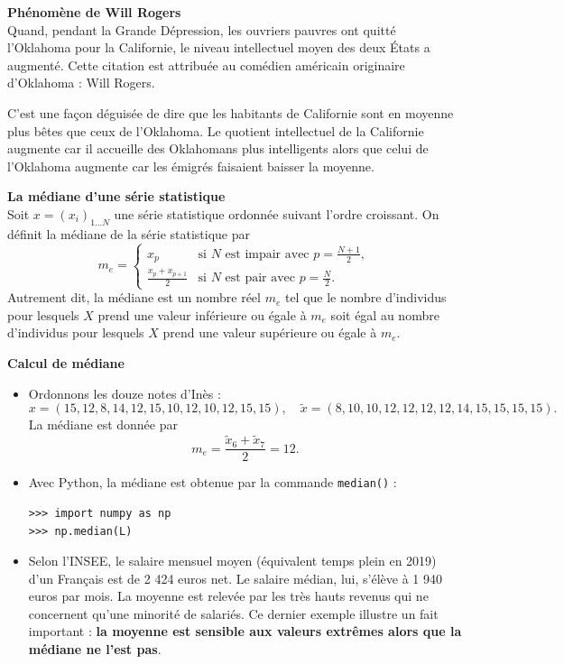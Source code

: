\documentclass[../PolyS4.tex]{subfiles}
\begin{document}
\begin{Rmq}\textbf{Phénomène de Will Rogers}\\

\og  Quand, pendant la Grande Dépression, les ouvriers pauvres ont quitté l'Oklahoma pour la Californie, le niveau intellectuel moyen des deux États a augmenté. \fg{}  Cette citation est attribuée au comédien américain originaire d'Oklahoma : Will Rogers.

C'est une façon déguisée de dire que les habitants de Californie sont en moyenne plus bêtes que ceux de l'Oklahoma. Le quotient intellectuel de la Californie augmente car il accueille des Oklahomans plus intelligents alors que celui de l'Oklahoma augmente car les émigrés faisaient baisser la moyenne.
\end{Rmq}

\begin{Def}\textbf{La médiane d'une série statistique}\\

Soit $x = (x_i)_{1 \ldots N}$ une série statistique ordonnée suivant l'ordre croissant. On définit la médiane de la série statistique par
\[
m_e =
\begin{cases}
x_p & \text{si } N \text{ est impair avec } p = \frac{N + 1}{2}, \\
\frac{x_p + x_{p+1}}{2} & \text{si } N \text{ est pair avec } p = \frac{N}{2}.
\end{cases}
\]
Autrement dit, la médiane est un nombre réel $m_e$ tel que le nombre d'individus pour lesquels $X$ prend une valeur inférieure ou égale à $m_e$ soit égal au nombre d'individus pour lesquels $X$ prend une valeur supérieure ou égale à $m_e$.
\end{Def}

\begin{Ex}\textbf{Calcul de médiane}\\

\begin{itemize}
    \item Ordonnons les douze notes d'Inès : 
    \[
    x = (15, 12, 8, 14, 12, 15, 10, 12, 10, 12, 15, 15), \quad \tilde{x} = (8, 10, 10, 12, 12, 12, 12, 14, 15, 15, 15, 15).
    \]
    La médiane est donnée par 
    \[
    m_e = \frac{\tilde{x}_6 + \tilde{x}_7}{2} = 12.
    \]
    
    \item Avec Python, la médiane est obtenue par la commande \texttt{median()} :
    \begin{verbatim}
>>> import numpy as np
>>> np.median(L)
    \end{verbatim}
    
    \item Selon l'INSEE, le salaire mensuel moyen (équivalent temps plein en 2019) d'un Français est de 2 424 euros net. Le salaire médian, lui, s'élève à 1 940 euros par mois. La moyenne est relevée par les très hauts revenus qui ne concernent qu'une minorité de salariés. Ce dernier exemple illustre un fait important : \textbf{la moyenne est sensible aux valeurs extrêmes alors que la médiane ne l'est pas}.
\end{itemize}
\end{Ex}
\end{document}
